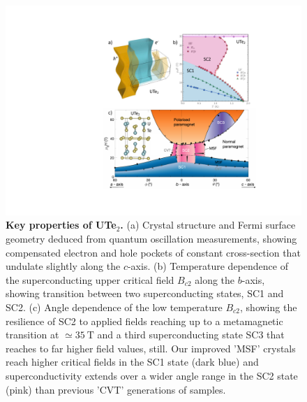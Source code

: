 \begin{figure}
  \includegraphics[width=\columnwidth]{Figures/UTe2Overview.pdf}
  \caption{{\bf Key properties of UTe$_2$.} (a) Crystal structure and Fermi surface geometry deduced from quantum oscillation measurements, showing compensated electron and hole pockets of constant cross-section that undulate slightly along the $c$-axis. (b) Temperature dependence of the superconducting upper critical field $B_{c2}$ along the $b$-axis, showing transition between two superconducting states, SC1 and SC2. (c) Angle dependence of the low temperature $B_{c2}$, showing the resilience of SC2 to applied fields reaching up to a metamagnetic transition at $\simeq \SI{35}{\tesla}$ and a third superconducting state SC3 that reaches to far higher field values, still. Our improved 'MSF' crystals reach higher critical fields in the SC1 state (dark blue) and superconductivity extends over a wider angle range in the SC2 state (pink) than previous 'CVT' generations of samples.}
  \label{fig:UTe2}
\end{figure}

